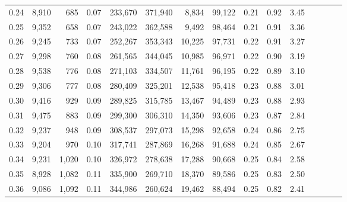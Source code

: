 \begin{tabular}{rrrcrrrrrrrrrrr}
0.24 &   8,910 &     685 &                                       0.07 &  233,670 &  371,940 &    8,834 &   99,122 &  0.21 &  0.92 &                         3.45 \\
0.25 &   9,352 &     658 &                                       0.07 &  243,022 &  362,588 &    9,492 &   98,464 &  0.21 &  0.91 &                         3.36 \\
0.26 &   9,245 &     733 &                                       0.07 &  252,267 &  353,343 &   10,225 &   97,731 &  0.22 &  0.91 &                         3.27 \\
0.27 &   9,298 &     760 &                                       0.08 &  261,565 &  344,045 &   10,985 &   96,971 &  0.22 &  0.90 &                         3.19 \\
0.28 &   9,538 &     776 &                                       0.08 &  271,103 &  334,507 &   11,761 &   96,195 &  0.22 &  0.89 &                         3.10 \\
0.29 &   9,306 &     777 &                                       0.08 &  280,409 &  325,201 &   12,538 &   95,418 &  0.23 &  0.88 &                         3.01 \\
0.30 &   9,416 &     929 &                                       0.09 &  289,825 &  315,785 &   13,467 &   94,489 &  0.23 &  0.88 &                         2.93 \\
0.31 &   9,475 &     883 &                                       0.09 &  299,300 &  306,310 &   14,350 &   93,606 &  0.23 &  0.87 &                         2.84 \\
0.32 &   9,237 &     948 &                                       0.09 &  308,537 &  297,073 &   15,298 &   92,658 &  0.24 &  0.86 &                         2.75 \\
0.33 &   9,204 &     970 &                                       0.10 &  317,741 &  287,869 &   16,268 &   91,688 &  0.24 &  0.85 &                         2.67 \\
0.34 &   9,231 &   1,020 &                                       0.10 &  326,972 &  278,638 &   17,288 &   90,668 &  0.25 &  0.84 &                         2.58 \\
0.35 &   8,928 &   1,082 &                                       0.11 &  335,900 &  269,710 &   18,370 &   89,586 &  0.25 &  0.83 &                         2.50 \\
0.36 &   9,086 &   1,092 &                                       0.11 &  344,986 &  260,624 &   19,462 &   88,494 &  0.25 &  0.82 &                         2.41 \\

\end{tabular}
